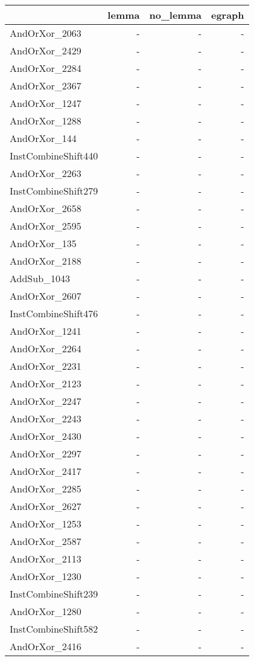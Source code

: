 \begin{tabular}{lrrr}
\toprule
 & lemma & no_lemma & egraph \\
\midrule
AndOrXor_2063 & - & - & - \\
AndOrXor_2429 & - & - & - \\
AndOrXor_2284 & - & - & - \\
AndOrXor_2367 & - & - & - \\
AndOrXor_1247 & - & - & - \\
AndOrXor_1288 & - & - & - \\
AndOrXor_144 & - & - & - \\
InstCombineShift440 & - & - & - \\
AndOrXor_2263 & - & - & - \\
InstCombineShift279 & - & - & - \\
AndOrXor_2658 & - & - & - \\
AndOrXor_2595 & - & - & - \\
AndOrXor_135 & - & - & - \\
AndOrXor_2188 & - & - & - \\
AddSub_1043 & - & - & - \\
AndOrXor_2607 & - & - & - \\
InstCombineShift476 & - & - & - \\
AndOrXor_1241 & - & - & - \\
AndOrXor_2264 & - & - & - \\
AndOrXor_2231 & - & - & - \\
AndOrXor_2123 & - & - & - \\
AndOrXor_2247 & - & - & - \\
AndOrXor_2243 & - & - & - \\
AndOrXor_2430 & - & - & - \\
AndOrXor_2297 & - & - & - \\
AndOrXor_2417 & - & - & - \\
AndOrXor_2285 & - & - & - \\
AndOrXor_2627 & - & - & - \\
AndOrXor_1253 & - & - & - \\
AndOrXor_2587 & - & - & - \\
AndOrXor_2113 & - & - & - \\
AndOrXor_1230 & - & - & - \\
InstCombineShift239 & - & - & - \\
AndOrXor_1280 & - & - & - \\
InstCombineShift582 & - & - & - \\
AndOrXor_2416 & - & - & - \\

\end{tabular}
